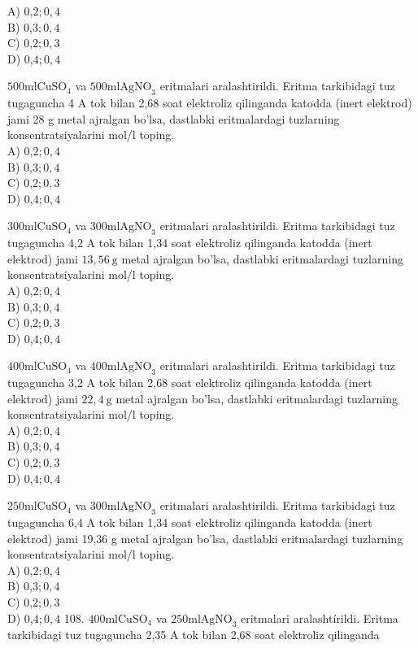 A) 0,$2 ; 0,4$\\
B) 0,$3 ; 0,4$\\
C) 0,$2 ; 0,3$\\
D) 0,$4 ; 0,4$
  \item $500 \mathrm{ml} \mathrm{CuSO}_{4}$ va $500 \mathrm{ml} \mathrm{AgNO}_{3}$ eritmalari aralashtirildi. Eritma tarkibidagi tuz tugaguncha 4 A tok bilan 2,68 soat elektroliz qilinganda katodda (inert elektrod) jami 28 g metal ajralgan bo'lsa, dastlabki eritmalardagi tuzlarning konsentratsiyalarini mol/l toping.\\
A) 0,$2 ; 0,4$\\
B) 0,$3 ; 0,4$\\
C) 0,$2 ; 0,3$\\
D) 0,$4 ; 0,4$
  \item $300 \mathrm{ml} \mathrm{CuSO}_{4}$ va $300 \mathrm{ml} \mathrm{AgNO}_{3}$ eritmalari aralashtirildi. Eritma tarkibidagi tuz tugaguncha 4,2 A tok bilan 1,34 soat elektroliz qilinganda katodda (inert elektrod) jami $13,56 \mathrm{~g}$ metal ajralgan bo'lsa, dastlabki eritmalardagi tuzlarning konsentratsiyalarini mol/l toping.\\
A) 0,$2 ; 0,4$\\
B) 0,$3 ; 0,4$\\
C) 0,$2 ; 0,3$\\
D) 0,$4 ; 0,4$
  \item $400 \mathrm{ml} \mathrm{CuSO}_{4}$ va $400 \mathrm{ml} \mathrm{AgNO}_{3}$ eritmalari aralashtirildi. Eritma tarkibidagi tuz tugaguncha 3,2 A tok bilan 2,68 soat elektroliz qilinganda katodda (inert elektrod) jami $22,4 \mathrm{~g}$ metal ajralgan bo'lsa, dastlabki eritmalardagi tuzlarning konsentratsiyalarini mol/l toping.\\
A) 0,$2 ; 0,4$\\
B) 0,$3 ; 0,4$\\
C) 0,$2 ; 0,3$\\
D) 0,$4 ; 0,4$
  \item $250 \mathrm{ml} \mathrm{CuSO}_{4}$ va $300 \mathrm{ml} \mathrm{AgNO}_{3}$ eritmalari aralashtirildi. Eritma tarkibidagi tuz tugaguncha 6,4 A tok bilan 1,34 soat elektroliz qilinganda katodda (inert elektrod) jami 19,36 g metal ajralgan bo'lsa, dastlabki eritmalardagi tuzlarning konsentratsiyalarini mol/l toping.\\
A) 0,$2 ; 0,4$\\
B) 0,$3 ; 0,4$\\
C) 0,$2 ; 0,3$\\
D) 0,$4 ; 0,4$
108. $400 \mathrm{ml} \mathrm{CuSO}_{4}$ va $250 \mathrm{ml} \mathrm{AgNO}_{3}$ eritmalari aralashtírildi. Eritma tarkibidagi tuz tugaguncha 2,35 A tok bilan 2,68 soat elektroliz qilinganda\\
